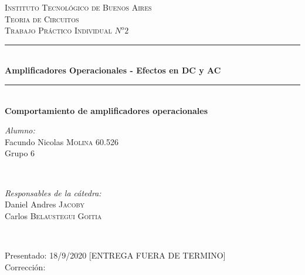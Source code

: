 \begin{titlepage}
    \newcommand{\HRule}{\rule{\linewidth}{0.5mm}}
    \center
    \textsc{\LARGE Instituto Tecnológico de Buenos Aires}\\[1.5cm]
    \textsc{\Large Teoria de Circuitos}\\[0.5cm]
    \textsc{\large Trabajo Práctico Individual $N^o2$}\\[0.5cm]
    
    \HRule \\[0.4cm]
    { \huge \bfseries Amplificadores Operacionales - Efectos en DC y AC}\\[0.1cm] %
    \HRule \\[0.5cm]
    
    { \LARGE \bfseries Comportamiento de amplificadores operacionales}
    \\[1.5cm]
    
    \begin{minipage}{0.4\textwidth}
    \begin{flushleft} \large
    \emph{Alumno:}\\
    Facundo Nicolas \textsc{Molina} 60.526\\
    Grupo 6\\
    \end{flushleft}
    \end{minipage}
    ~
    \begin{minipage}{0.4\textwidth}
    \begin{flushright} \large
    \emph{Responsables de la cátedra:} \\
    Daniel Andres \textsc{Jacoby}\\
    Carlos \textsc{Belaustegui Goitia}\\
    
    \end{flushright}
    \end{minipage}\\[4cm]
    
    \begin{minipage}{0.7\textwidth}
    \begin{flushleft} \large
    Presentado: 18/9/2020 [ENTREGA FUERA DE TERMINO]\\
    Corrección: \\
    \end{flushleft}
    \end{minipage}
    \vfill %
    
    \end{titlepage}
    